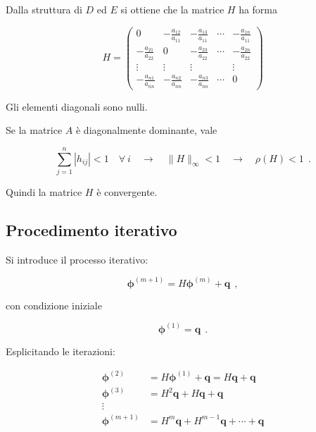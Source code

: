 Dalla struttura di $D$ ed $E$ si ottiene che la matrice $H$ ha forma

\begin{equation}
	H =
	\begin{pmatrix}
		0 & -\frac{a_{12}}{a_{11}} & -\frac{a_{13}}{a_{11}} & \cdots & -\frac{a_{1n}}{a_{11}} \\
		-\frac{a_{21}}{a_{22}} & 0 & -\frac{a_{23}}{a_{22}} & \cdots & -\frac{a_{2n}}{a_{22}} \\
		\vdots & \vdots & \vdots & & \vdots \\
		-\frac{a_{n1}}{a_{nn}} & -\frac{a_{n2}}{a_{nn}} & -\frac{a_{n3}}{a_{nn}} & \cdots & 0
	\end{pmatrix}
\end{equation}

Gli elementi diagonali sono nulli.

Se la matrice $A$ è diagonalmente dominante, vale

\begin{equation*}
	\sum_{j=1}^{n} |h_{ij}| < 1 \quad \forall\ i
	\quad \rightarrow \quad 
	\|H\|_\infty < 1 
	\quad \rightarrow \quad 
	\boxed{\rho(H) < 1}\ \ .
\end{equation*}

Quindi la matrice $H$ è convergente.

\subsection{Procedimento iterativo}

Si introduce il processo iterativo:

\begin{equation*}
	\boldsymbol{\phi}^{(m+1)} = H \boldsymbol{\phi}^{(m)} + \boldsymbol{q}\ \ ,
\end{equation*}

con condizione iniziale

\begin{equation*}
	\boldsymbol{\phi}^{(1)} = \boldsymbol{q}\ \ .
\end{equation*}

Esplicitando le iterazioni:

\begin{align*}
	\boldsymbol{\phi}^{(2)} &= H \boldsymbol{\phi}^{(1)} + \boldsymbol{q} = H \boldsymbol{q} + \boldsymbol{q} \\
	\boldsymbol{\phi}^{(3)} &= H^2 \boldsymbol{q} + H \boldsymbol{q} + \boldsymbol{q} \\
	\vdots \\
	\boldsymbol{\phi}^{(m+1)} &= H^m \boldsymbol{q} + H^{m-1} \boldsymbol{q} + \cdots + \boldsymbol{q}
\end{align*}

